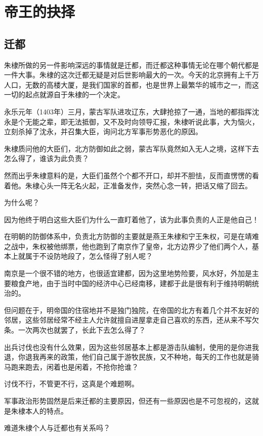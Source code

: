 \section{帝王的抉择}
\ifnum{}
	\begin{multicols}{\theparacolNo}
\fi
\subsection{迁都}
朱棣所做的另一件影响深远的事情就是迁都，而迁都这种事情无论在哪个朝代都是一件大事。朱棣的这次迁都无疑是对后世影响最大的一次。今天的北京拥有上千万人口，无数的高楼大厦，是我们国家的首都，也是世界上最繁华的城市之一，而这一切的起点就源自于朱棣的一个决定。

永乐元年（1403年）三月，蒙古军队进攻辽东，大肆抢掠了一通，当地的都指挥沈永是个无能之辈，即无法抵御，又不及时向领导汇报，朱棣听说此事，大为恼火，立刻杀掉了沈永，并召集大臣，询问北方军事形势恶化的原因。

朱棣质问他的大臣们，北方防御如此之弱，蒙古军队竟然如入无人之境，这样下去怎么得了，谁该为此负责？

然而出乎朱棣意料的是，大臣们虽然个个都不开口，却并不胆怯，反而直愣愣的看着他。朱棣心头一阵无名火起，正准备发作，突然心念一转，把话又缩了回去。

为什么呢？

因为他终于明白这些大臣们为什么一直盯着他了，该为此事负责的人正是他自己！

在明朝的防御体系中，负责北方防御的主要就是燕王朱棣和宁王朱权，可是在靖难之战中，朱权被他绑票，他也跑到了南京作了皇帝，北方边界少了他们两个人，基本上就属于不设防地段了，怎么怪得了别人呢？

南京是一个很不错的地方，也很适宜建都，因为这里地势险要，风水好，外加是主要粮食产地，由于当时中国的经济中心已经南移，建都于此是很有利于维持明朝统治的。

但问题在于，明帝国的住宿地并不是独门独院，在帝国的北方有着几个并不友好的邻居，这些邻居经常不经主人允许就擅自进屋拿走自己喜欢的东西，还从来不写欠条。一次两次也就罢了，长此下去怎么得了？

出兵讨伐也没有什么效果，因为这些邻居基本上都是游击队编制，使用的是你进我退，你退我再来的政策，他们自己属于游牧民族，又不种地，每天的工作也就是骑马跑来跑去，闲着也是闲着，不抢你抢谁？

讨伐不行，不管更不行，这真是个难题啊。

军事政治形势固然是后来迁都的主要原因，但还有一些原因也是不可忽视的，这就是朱棣本人的特点。

难道朱棣个人与迁都也有关系吗？


\end{multicols}
